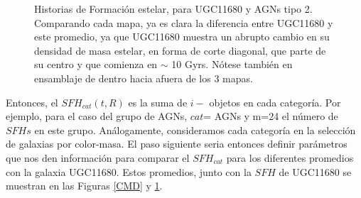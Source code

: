 \begin{figure}[htbp]
\centering
{}
\caption[Historias de Formación estelar, para UGC11680 y AGNs]{Historias de Formación estelar, para UGC11680  y AGNs tipo 2. Comparando cada mapa, ya es clara la diferencia entre UGC11680 y este promedio, ya que UGC11680 muestra un abrupto cambio en su densidad de masa estelar, en forma de corte diagonal, que parte de su centro y que comienza en $\sim$ 10 Gyrs. Nótese también en ensamblaje de dentro hacia afuera de los 3 mapas.}
\label{all_agns_sfh}
\end{figure}


\noindent Entonces, el $SFH_{cat}(t,R)$ es la suma  de $i-$ objetos en cada categoría.
Por ejemplo, para el caso del grupo de AGNs, $cat$= AGNs y m=24 el número de $SFHs$
en este grupo. Análogamente, consideramos cada categoría en la selección de galaxias por color-masa.
El paso siguiente seria entonces definir parámetros que nos den información
para comparar  el $SFH_{cat}$ para los diferentes promedios con la galaxia UGC11680. Estos promedios, junto con la $SFH$ de UGC11680 se muestran en las Figuras \ref{CMD} y \ref{all_agns_sfh}.
\bigskip


